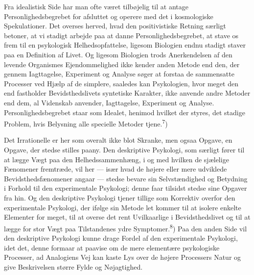 \documentclass[12pt,a4paper,openany]{book}
\newcommand{\opage}[1]{\marginnote{\footnotesize\textit{[#1]}}}
\begin{document}
Fra idealistisk Side har man ofte været tilbøjelig til at antage
Personlighedsbegrebet for afsluttet og operere med det i kosmologiske
Spekulationer. Det overses herved, hvad den positivistiske Retning særligt
betoner, at vi stadigt arbejde paa at danne Personlighedsbegrebet, at stave os
frem til en psykologisk Helhedsopfattelse, ligesom Biologien endnu stadigt
staver paa en Definition af Livet. Og ligesom Biologien trods Anerkendelsen af
den levende Organismes Ejendommelighed ikke kender anden Metode end den, der
gennem Iagttagelse, Experiment og Analyse søger at forstaa de sammensatte
Processer ved Hjælp af de simplere, saaledes kan Psykologien, hvor meget den
end fastholder Bevidsthedslivets syntetiske Karakter, ikke anvende andre
Metoder end dem, al Videnskab anvender, Iagttagelse, Experiment og Analyse.
Personlighedsbegrebet staar
\opage{11}som Idealet, henimod hvilket der styres, det stadige Problem, hvis
Belysning alle specielle Metoder tjene.\textsuperscript{7})

Det Irrationelle er her som overalt ikke blot Skranke, men ogsaa Opgave, en
Opgave, der stedse stilles paany. Den deskriptive Psykologi, som særligt fører
til at lægge Vægt paa den Helhedssammenhæng, i og med hvilken de sjælelige
Fænomener fremtræde, vil her --- især hvad de højere eller mere udviklede
Bevidsthedsfænomener angaar --- stedse bevare sin Selvstændighed og Betydning i
Forhold til den experimentale Psykologi; denne faar tilsidst stedse sine
Opgaver fra hin. Og den deskriptive Psykologi tjener tillige som Korrektiv
overfor den experimentale Psykologi, der ifølge sin Metode let kommer til at
isolere enkelte Elementer for meget, til at overse det rent Uvilkaarlige i
Bevidsthedslivet og til at lægge for stor Vægt paa Tilstandenes ydre
Symptomer.\textsuperscript{8}) Paa den anden Side vil den deskriptive Psykologi
kunne drage Fordel af den experimentale Psykologi, idet det, denne formaar at
paavise om de mere elementære psykologiske Processer, ad Analogiens Vej kan
kaste Lys over de højere Processers Natur og give Beskrivelsen større Fylde og
Nøjagtighed.
\end{document}
